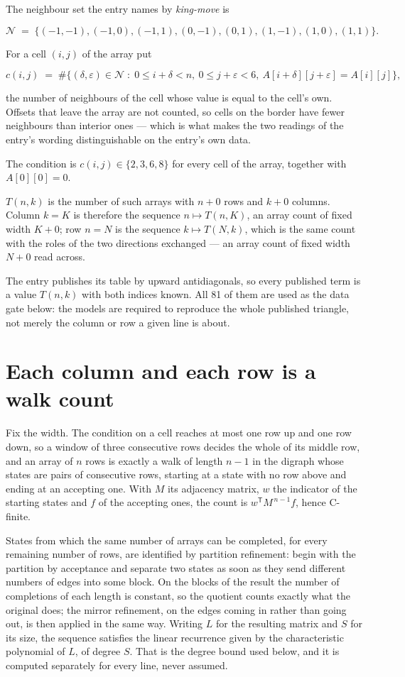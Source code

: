\documentclass[11pt]{article}
\theoremstyle{definition}
\begin{document}
The neighbour set the entry names by {\itshape king-move} is

\[\mathcal{N} \;=\; \{(-1,-1), (-1,0), (-1,1), (0,-1), (0,1), (1,-1), (1,0), (1,1)\}.\]

For a cell $(i,j)$ of the array put

\[c(i,j) \;=\; \#\bigl\{(\delta,\varepsilon)\in\mathcal{N} \;:\; 0\le i+\delta<n,\ 0\le j+\varepsilon<6,\ A[i+\delta][j+\varepsilon] = A[i][j]\bigr\},\]

the number of neighbours of the cell whose value is equal to the cell's own. Offsets that leave the array are not counted, so cells on the border have fewer neighbours than interior ones --- which is what makes the two readings of the entry's wording distinguishable on the entry's own data.

The condition is $c(i,j) \in \{2, 3, 6, 8\}$ for every cell of the array, together with $A[0][0]=0$.

$T(n,k)$ is the number of such arrays with $n + 0$ rows and $k + 0$ columns. Column $k = K$ is therefore the sequence $n \mapsto T(n,K)$, an array count of fixed width $K + 0$; row $n = N$ is the sequence $k \mapsto T(N,k)$, which is the same count with the roles of the two directions exchanged --- an array count of fixed width $N + 0$ read across.

The entry publishes its table by upward antidiagonals, so every published term is a value $T(n,k)$ with both indices known. All 81 of them are used as the data gate below: the models are required to reproduce the whole published triangle, not merely the column or row a given line is about.

\section{Each column and each row is a walk count}

Fix the width. The condition on a cell reaches at most one row up and one row down, so a window of three consecutive rows decides the whole of its middle row, and an array of $n$ rows is exactly a walk of length $n-1$ in the digraph whose states are pairs of consecutive rows, starting at a state with no row above and ending at an accepting one. With $M$ its adjacency matrix, $w$ the indicator of the starting states and $f$ of the accepting ones, the count is $w^{\mathsf T}M^{\,n-1}f$, hence C-finite.

States from which the same number of arrays can be completed, for every remaining number of rows, are identified by partition refinement: begin with the partition by acceptance and separate two states as soon as they send different numbers of edges into some block. On the blocks of the result the number of completions of each length is constant, so the quotient counts exactly what the original does; the mirror refinement, on the edges coming in rather than going out, is then applied in the same way. Writing $L$ for the resulting matrix and $S$ for its size, the sequence satisfies the linear recurrence given by the characteristic polynomial of $L$, of degree $S$. That is the degree bound used below, and it is computed separately for every line, never assumed.
\end{document}
